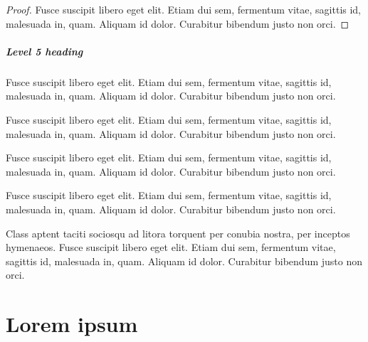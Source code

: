\begin{proof}
Fusce suscipit libero eget elit. Etiam dui sem, fermentum vitae, sagittis id, malesuada in, quam. Aliquam id dolor. Curabitur bibendum justo non orci.
\end{proof}

\paragraph{Level 5 heading}

\begin{corollary}
Fusce suscipit libero eget elit. Etiam dui sem, fermentum vitae, sagittis id, malesuada in, quam. Aliquam id dolor. Curabitur bibendum justo non orci.
\end{corollary}

\begin{proposition}
Fusce suscipit libero eget elit. Etiam dui sem, fermentum vitae, sagittis id, malesuada in, quam. Aliquam id dolor. Curabitur bibendum justo non orci.
\end{proposition}

\begin{note}
Fusce suscipit libero eget elit. Etiam dui sem, fermentum vitae, sagittis id, malesuada in, quam. Aliquam id dolor. Curabitur bibendum justo non orci.
\end{note}

\begin{remark}
Fusce suscipit libero eget elit. Etiam dui sem, fermentum vitae, sagittis id, malesuada in, quam. Aliquam id dolor. Curabitur bibendum justo non orci.
\end{remark}

\begin{lemma}
Class aptent taciti sociosqu ad litora torquent per conubia nostra, per inceptos hymenaeos. Fusce suscipit libero eget elit. Etiam dui sem, fermentum vitae, sagittis id, malesuada in, quam. Aliquam id dolor. Curabitur bibendum justo non orci.
\end{lemma}

\lipsum[1-2]

% 

\chapter{Lorem ipsum}

